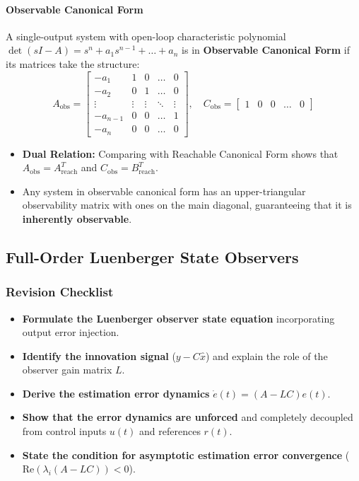 \documentclass[12pt,onecolumn,twoside ]{article}
\begin{document}
	\paragraph{Observable Canonical Form}
	A single-output system with open-loop characteristic polynomial $\det(sI - A) = s^n + a_1 s^{n-1} + \dots + a_n$ is in \textbf{Observable Canonical Form} if its matrices take the structure: \[
	A_{\text{obs}} = \begin{bmatrix} -a_1 & 1 & 0 & \dots & 0 \\ -a_2 & 0 & 1 & \dots & 0 \\ \vdots & \vdots & \vdots & \ddots & \vdots \\ -a_{n-1} & 0 & 0 & \dots & 1 \\ -a_n & 0 & 0 & \dots & 0 \end{bmatrix}, \quad C_{\text{obs}} = \begin{bmatrix} 1 & 0 & 0 & \dots & 0 \end{bmatrix}
	\]
	\begin{itemize}
		\item
		\textbf{Dual Relation:} Comparing with Reachable Canonical Form shows that $A_{\text{obs}} = A_{\text{reach}}^T$ and $C_{\text{obs}} = B_{\text{reach}}^T$.
		\item
		Any system in observable canonical form has an upper-triangular observability matrix with ones on the main diagonal, guaranteeing that it is \textbf{inherently observable}.
	\end{itemize}
	
	\subsection{Full-Order Luenberger State Observers}
	\subsubsection{Revision Checklist}
	\begin{itemize}
		\item[$\square$]
		\textbf{Formulate the Luenberger observer state equation} incorporating output error injection.
		\item[$\square$]
		\textbf{Identify the innovation signal} ($y - C\hat{x}$) and explain the role of the observer gain matrix $L$.
		\item[$\square$]
		\textbf{Derive the estimation error dynamics} $\dot{e}(t) = (A - LC)e(t)$.
		\item[$\square$]
		\textbf{Show that the error dynamics are unforced} and completely decoupled from control inputs $u(t)$ and references $r(t)$.
		\item[$\square$]
		\textbf{State the condition for asymptotic estimation error convergence} ($\text{Re}(\lambda_i(A - LC)) < 0$).
	\end{itemize}
	
\end{document}
